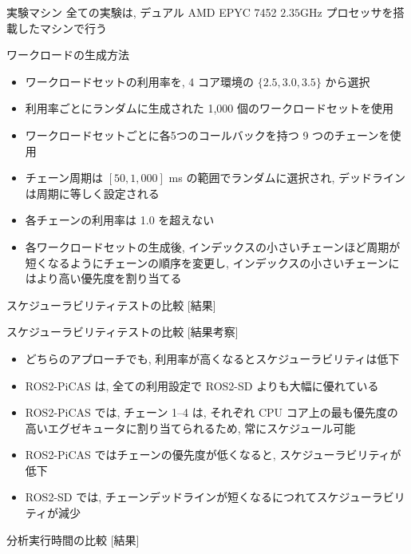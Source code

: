 \begin{frame}{実験マシン}
    全ての実験は, デュアル AMD EPYC 7452 $2.35 \mathrm{GHz}$ プロセッサを搭載したマシンで行う
\end{frame}

\begin{frame}{ワークロードの生成方法}
    \begin{itemize}
        \item ワークロードセットの利用率を, 4 コア環境の $\{2.5,3.0,3.5\}$ から選択
        \item 利用率ごとにランダムに生成された 1,000 個のワークロードセットを使用
        \item ワークロードセットごとに各5つのコールバックを持つ 9 つのチェーンを使用
        \item チェーン周期は $[50,1{,}000]$ ms の範囲でランダムに選択され, デッドラインは周期に等しく設定される
        \item 各チェーンの利用率は 1.0 を超えない
        \item 各ワークロードセットの生成後, インデックスの小さいチェーンほど周期が短くなるようにチェーンの順序を変更し, インデックスの小さいチェーンにはより高い優先度を割り当てる
    \end{itemize}
\end{frame}

\begin{frame}{スケジューラビリティテストの比較 [結果]}
\end{frame}

\begin{frame}{スケジューラビリティテストの比較 [結果考察]}
    \begin{itemize}
        \item どちらのアプローチでも, 利用率が高くなるとスケジューラビリティは低下
        \item ROS2-PiCAS は, 全ての利用設定で ROS2-SD よりも大幅に優れている
        \item ROS2-PiCAS では, チェーン 1--4 は, それぞれ CPU コア上の最も優先度の高いエグゼキュータに割り当てられるため, 常にスケジュール可能
        \item ROS2-PiCAS ではチェーンの優先度が低くなると, スケジューラビリティが低下
        \item ROS2-SD では, チェーンデッドラインが短くなるにつれてスケジューラビリティが減少
    \end{itemize}
\end{frame}

\begin{frame}{分析実行時間の比較 [結果]}
\end{frame}

